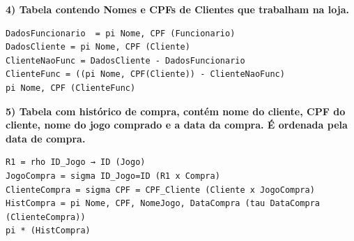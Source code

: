 \documentclass[11pt]{article}
\begin{document}
\textbf{4) Tabela contendo Nomes e CPFs de Clientes que trabalham na loja.}
\begin{Verbatim}[breaklines=true, breakanywhere=true]
DadosFuncionario  = pi Nome, CPF (Funcionario)
DadosCliente = pi Nome, CPF (Cliente)
ClienteNaoFunc = DadosCliente - DadosFuncionario
ClienteFunc = ((pi Nome, CPF(Cliente)) - ClienteNaoFunc)
pi Nome, CPF (ClienteFunc)
\end{Verbatim}
\textbf{5) Tabela com histórico de compra, contém nome do cliente, CPF do cliente, nome do jogo comprado e a data da compra. É ordenada pela data de compra.}
\begin{Verbatim}[breaklines=true, breakanywhere=true]
R1 = rho ID_Jogo → ID (Jogo)
JogoCompra = sigma ID_Jogo=ID (R1 x Compra)
ClienteCompra = sigma CPF = CPF_Cliente (Cliente x JogoCompra)
HistCompra = pi Nome, CPF, NomeJogo, DataCompra (tau DataCompra (ClienteCompra))
pi * (HistCompra)
\end{Verbatim}
\end{document}
